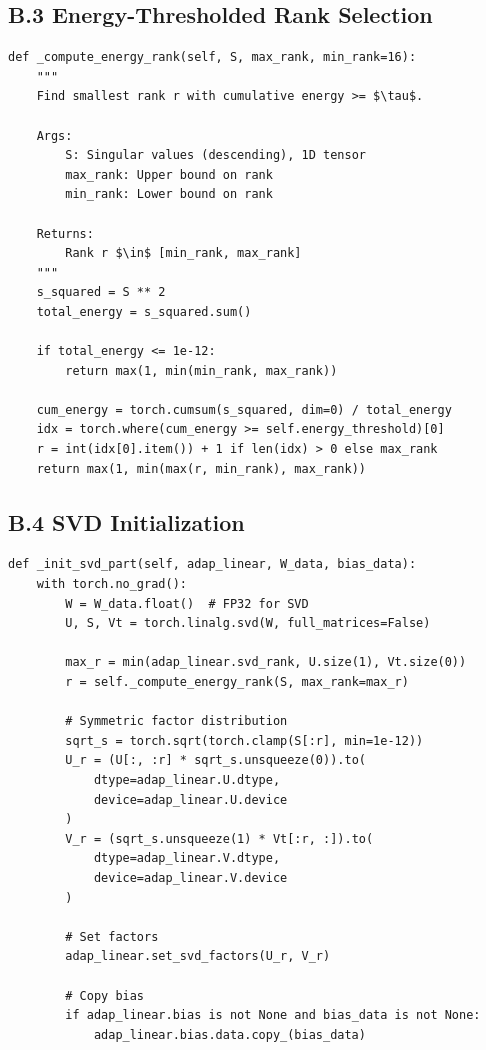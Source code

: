 \subsection{B.3 Energy-Thresholded Rank Selection}

\begin{lstlisting}
def _compute_energy_rank(self, S, max_rank, min_rank=16):
    """
    Find smallest rank r with cumulative energy >= $\tau$.
    
    Args:
        S: Singular values (descending), 1D tensor
        max_rank: Upper bound on rank
        min_rank: Lower bound on rank
    
    Returns:
        Rank r $\in$ [min_rank, max_rank]
    """
    s_squared = S ** 2
    total_energy = s_squared.sum()
    
    if total_energy <= 1e-12:
        return max(1, min(min_rank, max_rank))
    
    cum_energy = torch.cumsum(s_squared, dim=0) / total_energy
    idx = torch.where(cum_energy >= self.energy_threshold)[0]
    r = int(idx[0].item()) + 1 if len(idx) > 0 else max_rank
    return max(1, min(max(r, min_rank), max_rank))
\end{lstlisting}

\subsection{B.4 SVD Initialization}

\begin{lstlisting}
def _init_svd_part(self, adap_linear, W_data, bias_data):
    with torch.no_grad():
        W = W_data.float()  # FP32 for SVD
        U, S, Vt = torch.linalg.svd(W, full_matrices=False)
        
        max_r = min(adap_linear.svd_rank, U.size(1), Vt.size(0))
        r = self._compute_energy_rank(S, max_rank=max_r)
        
        # Symmetric factor distribution
        sqrt_s = torch.sqrt(torch.clamp(S[:r], min=1e-12))
        U_r = (U[:, :r] * sqrt_s.unsqueeze(0)).to(
            dtype=adap_linear.U.dtype,
            device=adap_linear.U.device
        )
        V_r = (sqrt_s.unsqueeze(1) * Vt[:r, :]).to(
            dtype=adap_linear.V.dtype,
            device=adap_linear.V.device
        )
        
        # Set factors
        adap_linear.set_svd_factors(U_r, V_r)
        
        # Copy bias
        if adap_linear.bias is not None and bias_data is not None:
            adap_linear.bias.data.copy_(bias_data)
\end{lstlisting}

